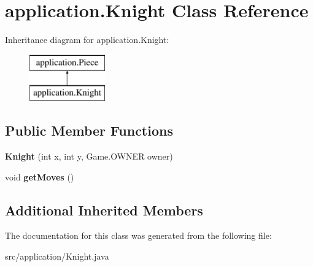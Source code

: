\hypertarget{classapplication_1_1_knight}{\section{application.\+Knight Class Reference}
\label{classapplication_1_1_knight}
}
Inheritance diagram for application.\+Knight\+:\begin{figure}[H]
\begin{center}
\leavevmode
\includegraphics[height=2.000000cm]{classapplication_1_1_knight}
\end{center}
\end{figure}
\subsection*{Public Member Functions}
\begin{DoxyCompactItemize}
\item 
\hypertarget{classapplication_1_1_knight_a514487094841cbb827eea58b780f488e}{{\bfseries Knight} (int x, int y, Game.\+O\+W\+N\+E\+R owner)}\label{classapplication_1_1_knight_a514487094841cbb827eea58b780f488e}

\item 
\hypertarget{classapplication_1_1_knight_adf3b8759d81165000cf35274ba4e36b2}{void {\bfseries get\+Moves} ()}\label{classapplication_1_1_knight_adf3b8759d81165000cf35274ba4e36b2}

\end{DoxyCompactItemize}
\subsection*{Additional Inherited Members}


The documentation for this class was generated from the following file\+:\begin{DoxyCompactItemize}
\item 
src/application/Knight.\+java\end{DoxyCompactItemize}
